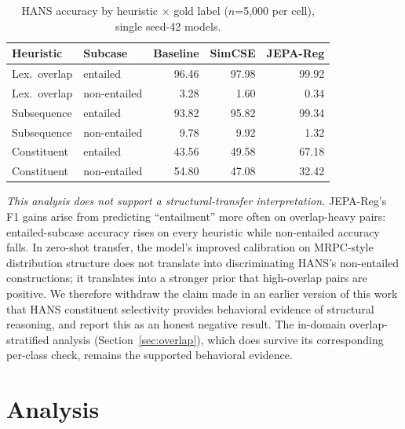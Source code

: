 \documentclass[sigconf]{acmart}
\begin{document}
\begin{table}[!htbp]
\caption{HANS accuracy by heuristic $\times$ gold label ($n$=5{,}000 per cell), single seed-42 models.}
\label{tab:hans}
\begin{tabular}{llrrr}
\toprule
Heuristic & Subcase & Baseline & SimCSE & JEPA-Reg \\
\midrule
Lex.\ overlap & entailed     & 96.46 & 97.98 & 99.92 \\
Lex.\ overlap & non-entailed & 3.28  & 1.60  & 0.34  \\
Subsequence   & entailed     & 93.82 & 95.82 & 99.34 \\
Subsequence   & non-entailed & 9.78  & 9.92  & 1.32  \\
Constituent   & entailed     & 43.56 & 49.58 & 67.18 \\
Constituent   & non-entailed & 54.80 & 47.08 & 32.42 \\
\bottomrule
\end{tabular}
\end{table}

\emph{This analysis does not support a structural-transfer interpretation.} JEPA-Reg's F1 gains arise from predicting ``entailment'' more often on overlap-heavy pairs: entailed-subcase accuracy rises on every heuristic while non-entailed accuracy falls. In zero-shot transfer, the model's improved calibration on MRPC-style distribution structure does not translate into discriminating HANS's non-entailed constructions; it translates into a stronger prior that high-overlap pairs are positive. We therefore withdraw the claim made in an earlier version of this work that HANS constituent selectivity provides behavioral evidence of structural reasoning, and report this as an honest negative result. The in-domain overlap-stratified analysis (Section~\ref{sec:overlap}), which does survive its corresponding per-class check, remains the supported behavioral evidence.

\section{Analysis}
\end{document}

